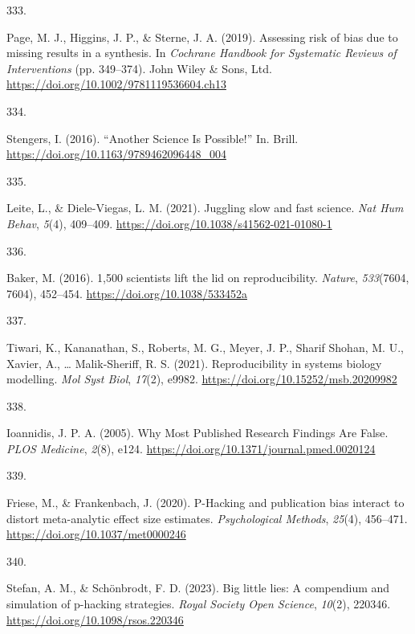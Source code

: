 \documentclass[
  11pt,
  letterpaper,
]{scrreprt}
\newlength{\cslhangindent}
\newlength{\csllabelwidth}
\newenvironment{CSLReferences}[2] %
 {\begin{list}{}{%
  \setlength{\itemindent}{0pt}
  \setlength{\leftmargin}{0pt}
  \setlength{\parsep}{0pt}
  \ifodd #1
   \setlength{\leftmargin}{\cslhangindent}
   \setlength{\itemindent}{-1\cslhangindent}
  \fi
  \setlength{\itemsep}{#2\baselineskip}}}
 {\end{list}}
\newcommand{\CSLLeftMargin}[1]{\parbox[t]{\csllabelwidth}{\strut#1\strut}}
\newcommand{\CSLRightInline}[1]{\parbox[t]{\linewidth - \csllabelwidth}{\strut#1\strut}}
\begin{document}
\begin{CSLReferences}{0}{0}
\CSLLeftMargin{333. }%
\CSLRightInline{Page, M. J., Higgins, J. P., \& Sterne, J. A. (2019).
Assessing risk of bias due to missing results in a synthesis. In
\emph{Cochrane {Handbook} for {Systematic Reviews} of {Interventions}}
(pp. 349--374). John Wiley \& Sons, Ltd.
\url{https://doi.org/10.1002/9781119536604.ch13}}

\CSLLeftMargin{334. }%
\CSLRightInline{Stengers, I. (2016). {``{Another Science Is
Possible}!''} In. Brill.
\url{https://doi.org/10.1163/9789462096448_004}}

\CSLLeftMargin{335. }%
\CSLRightInline{Leite, L., \& Diele-Viegas, L. M. (2021). Juggling slow
and fast science. \emph{Nat Hum Behav}, \emph{5}(4), 409--409.
\url{https://doi.org/10.1038/s41562-021-01080-1}}

\CSLLeftMargin{336. }%
\CSLRightInline{Baker, M. (2016). 1,500 scientists lift the lid on
reproducibility. \emph{Nature}, \emph{533}(7604, 7604), 452--454.
\url{https://doi.org/10.1038/533452a}}

\CSLLeftMargin{337. }%
\CSLRightInline{Tiwari, K., Kananathan, S., Roberts, M. G., Meyer, J.
P., Sharif Shohan, M. U., Xavier, A., \ldots{} Malik-Sheriff, R. S.
(2021). Reproducibility in systems biology modelling. \emph{Mol Syst
Biol}, \emph{17}(2), e9982. \url{https://doi.org/10.15252/msb.20209982}}

\CSLLeftMargin{338. }%
\CSLRightInline{Ioannidis, J. P. A. (2005). Why {Most Published Research
Findings Are False}. \emph{PLOS Medicine}, \emph{2}(8), e124.
\url{https://doi.org/10.1371/journal.pmed.0020124}}

\CSLLeftMargin{339. }%
\CSLRightInline{Friese, M., \& Frankenbach, J. (2020). P-{Hacking} and
publication bias interact to distort meta-analytic effect size
estimates. \emph{Psychological Methods}, \emph{25}(4), 456--471.
\url{https://doi.org/10.1037/met0000246}}

\CSLLeftMargin{340. }%
\CSLRightInline{Stefan, A. M., \& Schönbrodt, F. D. (2023). Big little
lies: A compendium and simulation of p-hacking strategies. \emph{Royal
Society Open Science}, \emph{10}(2), 220346.
\url{https://doi.org/10.1098/rsos.220346}}


\end{CSLReferences}
\end{document}
